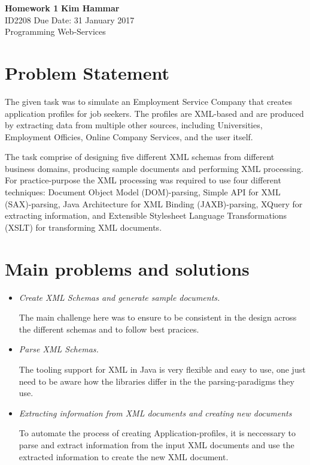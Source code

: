 \documentclass[a4paper, 11pt]{article}
\begin{document}
\noindent
\large\textbf{Homework 1} \hfill \textbf{Kim Hammar} \\
\normalsize ID2208 \hfill Due Date: 31 January 2017 \\
Programming Web-Services \hfill \\

\section*{Problem Statement}
The given task was to simulate an Employment Service Company that creates application profiles for job seekers. The profiles are XML-based and are produced by extracting data from multiple other sources, including Universities, Employment Officies, Online Company Services, and the user itself.

The task comprise of designing five different XML schemas from different business domains, producing sample documents and performing XML processing. For practice-purpose the XML processing was required to use four different techniques: Document Object Model (DOM)-parsing, Simple API for XML (SAX)-parsing, Java Architecture for XML Binding (JAXB)-parsing, XQuery for extracting information,  and Extensible Stylesheet Language Transformations (XSLT) for transforming XML documents. 
\section*{Main problems and solutions}
\begin{itemize}
\item \textit{Create XML Schemas and generate sample documents.}
  
  The main challenge here was to ensure to be consistent in the design across the different schemas and to follow best pracices.
\item \textit{Parse XML Schemas.}
  
  The tooling support for XML in Java is very flexible and easy to use, one just need to be aware how the libraries differ in the the parsing-paradigms they use.
\item \textit{Extracting information from XML documents and creating new documents}
  
  To automate the process of creating Application-profiles, it is neccessary to parse and extract information from the input XML documents and use the extracted information to create the new XML document.
\end{itemize}
\end{document}
